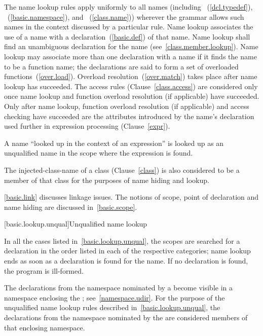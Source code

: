 \pnum
The name lookup rules apply uniformly to all names (including
~(\ref{dcl.typedef}),
~(\ref{basic.namespace}), and
~(\ref{class.name})) wherever the grammar allows
such names in the context discussed by a particular rule. Name lookup
associates the use of a name with a declaration~(\ref{basic.def}) of
that name. Name lookup shall find an unambiguous declaration for the
name (see~\ref{class.member.lookup}). Name lookup may associate more
than one declaration with a name if it finds the name to be a function
name; the declarations are said to form a set of overloaded
functions~(\ref{over.load}). Overload resolution~(\ref{over.match})
takes place after name lookup has succeeded. The access rules
(Clause~\ref{class.access}) are considered only once name lookup and
function overload resolution (if applicable) have succeeded. Only after
name lookup, function overload resolution (if applicable) and access
checking have succeeded are the attributes introduced by the name's
declaration used further in expression processing (Clause~\ref{expr}).

\pnum
A name ``looked up in the context of an expression'' is looked up as an
unqualified name in the scope where the expression is found.

\pnum
The injected-class-name of a class (Clause~\ref{class}) is also
considered to be a member of that class for the purposes of name hiding
and lookup.

\pnum
\enternote \ref{basic.link} discusses linkage issues. The notions of
scope, point of declaration and name hiding are discussed
in~\ref{basic.scope}. \exitnote

[basic.lookup.unqual]{Unqualified name lookup}

\pnum
{}%
%
In all the cases listed in~\ref{basic.lookup.unqual}, the scopes are
searched for a declaration in the order listed in each of the respective
categories; name lookup ends as soon as a declaration is found for the
name. If no declaration is found, the program is ill-formed.

\pnum
The declarations from the namespace nominated by a
 become visible in a namespace enclosing the
; see~\ref{namespace.udir}. For the purpose of
the unqualified name lookup rules described
in~\ref{basic.lookup.unqual}, the declarations from the namespace
nominated by the  are considered members of
that enclosing namespace.

